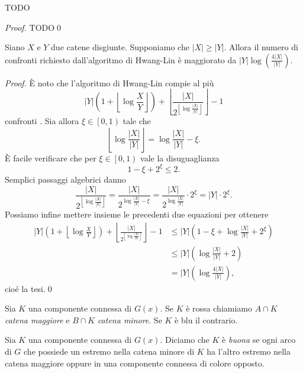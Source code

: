 {\begin{definition}
\end{definition}
\begin{lemma}
	\label{consistentlemma} TODO 
\end{lemma}
\begin{proof}
	TODO\qed 
\end{proof}
\begin{lemma}
	\label{hwanglinlemma} Siano \(X\) e \(Y\) due catene disgiunte. Supponiamo che \(|X|\ge|Y|\). Allora il numero di confronti richiesto dall'algoritmo di Hwang-Lin è maggiorato da \(|Y|\log(\frac{4|X|}{|Y|})\). 
\end{lemma}
\begin{proof}
	È noto che l'algoritmo di Hwang-Lin compie al più
	\[|Y|\left(1+\left\lfloor{\log{\frac{X}{Y}}}\right\rfloor\right)+\left\lfloor\frac{|X|}{2^{\left\lfloor\log{\frac{|X|}{|Y|}}\right\rfloor}}\right\rfloor-1\]
	confronti \cite{Hwang1972}. Sia allora \(\xi\in\left[0,1\right)\) tale che
	\[\left\lfloor\log{\frac{|X|}{|Y|}}\right\rfloor=\log{\frac{|X|}{|Y|}}-\xi.\]
	È facile verificare che per \(\xi\in\left[0,1\right)\) vale la disuguaglianza
	\[1-\xi+2^{\xi}\le 2.\]
	Semplici passaggi algebrici danno
	\[\frac{|X|}{2^{\left\lfloor\log{\frac{|X|}{|Y|}}\right\rfloor}}=\frac{|X|}{2^{\log{\frac{|X|}{|Y|}}-\xi}}=\frac{|X|}{2^{\log{\frac{|X|}{|Y|}}}}\cdot 2^{\xi}=|Y|\cdot 2^{\xi}.\]
	Possiamo infine mettere insieme le precedenti due equazioni per ottenere 
	\begin{align}
		|Y|\left(1+\left\lfloor{\log{\frac{X}{Y}}}\right\rfloor\right)+\left\lfloor\frac{|X|}{2^{\left\lfloor\log{\frac{|X|}{|Y|}}\right\rfloor}}\right\rfloor-1&\le|Y|\left(1-\xi+\log{\frac{|X|}{|Y|}}+2^{\xi}\right) \nonumber \\
		&\le |Y|\left(\log{\frac{|X|}{|Y|}}+2\right) \nonumber \\
		&= |Y|\left(\log{\frac{4|X|}{|Y|}}\right), \nonumber 
	\end{align}
	cioé la tesi.\qed 
\end{proof}
\begin{definition}
	Sia \(K\) una componente connessa di \(G(x)\). Se \(K\) è rossa chiamiamo \(A\cap K\) \emph{catena maggiore} e \(B\cap K\) \emph{catena minore}. Se \(K\) è blu il contrario. 
\end{definition}
\begin{definition}
	Sia \(K\) una componente connessa di \(G(x)\). Diciamo che \(K\) è \emph{buona} se ogni arco di \(G\) che possiede un estremo nella catena minore di \(K\) ha l'altro estremo nella catena maggiore oppure in una componente connessa di colore opposto. 

\end{definition}}

